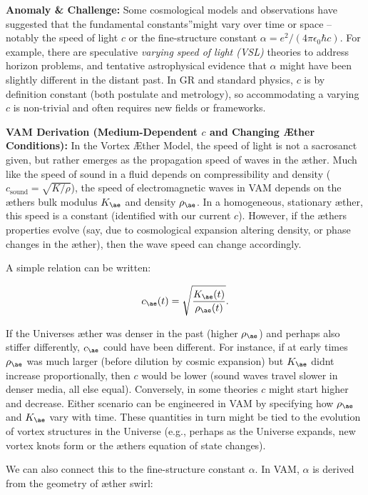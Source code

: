 \documentclass[a4paper, aps,preprint,superscriptaddress, 12pt]{revtex4}
\begin{document}
\textbf{Anomaly \& Challenge: } Some cosmological models and observations have suggested that the fundamental \grqq constants\textquotedblright might vary over time or space – notably the speed of light $c$ or the fine-structure constant $\alpha = e^2/(4\pi\epsilon_0\hbar c)$. For example, there are speculative \textit{varying speed of light (VSL)} theories to address horizon problems, and tentative astrophysical evidence that $\alpha$ might have been slightly different in the distant past. In GR and standard physics, $c$ is by definition constant (both postulate and metrology), so accommodating a varying $c$ is non-trivial and often requires new fields or frameworks.


\textbf{VAM Derivation (Medium-Dependent $c$ and Changing Æther Conditions):} In the Vortex Æther Model, the speed of light is not a sacrosanct given, but rather emerges as the propagation speed of waves in the æther. Much like the speed of sound in a fluid depends on compressibility and density ($c_{\text{sound}} = \sqrt{K/\rho}$), the speed of electromagnetic waves in VAM depends on the æther\rqs s bulk modulus $K_{\ae}$ and density $\rho_{\ae}$. In a homogeneous, stationary æther, this speed is a constant (identified with our current $c$). However, if the æther\rqs s properties evolve (say, due to cosmological expansion altering density, or phase changes in the æther), then the wave speed can change accordingly.


A simple relation can be written:

\begin{equation}
    c_{\ae}(t) = \sqrt{\frac{K_{\ae}(t)}{\rho_{\ae}(t)}}.
\end{equation}

If the Universe\rqs s æther was denser in the past (higher $\rho_{\ae}$) and perhaps also stiffer differently, $c_{\ae}$ could have been different. For instance, if at early times $\rho_{\ae}$ was much larger (before dilution by cosmic expansion) but $K_{\ae}$ didn\rqs t increase proportionally, then $c$ would be lower (sound waves travel slower in denser media, all else equal). Conversely, in some theories $c$ might start higher and decrease. Either scenario can be engineered in VAM by specifying how $\rho_{\ae}$ and $K_{\ae}$ vary with time. These quantities in turn might be tied to the evolution of vortex structures in the Universe (e.g., perhaps as the Universe expands, new vortex knots form or the æther\rqs s equation of state changes).


We can also connect this to the fine-structure constant $\alpha$. In VAM, $\alpha$ is derived from the geometry of æther swirl:
\end{document}
